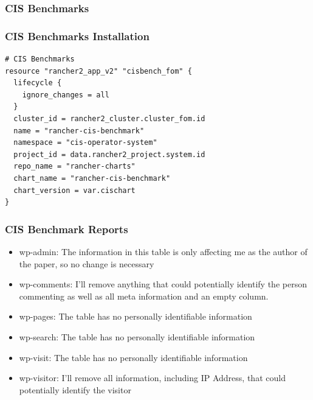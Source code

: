 \subsubsection{CIS Benchmarks}

\subsubsection{CIS Benchmarks Installation}

\begin{lstlisting}[caption=Installing CIS, frame=single, basicstyle=\ttfamily]
# CIS Benchmarks
resource "rancher2_app_v2" "cisbench_fom" {
  lifecycle {
    ignore_changes = all
  }
  cluster_id = rancher2_cluster.cluster_fom.id
  name = "rancher-cis-benchmark"
  namespace = "cis-operator-system"
  project_id = data.rancher2_project.system.id
  repo_name = "rancher-charts"
  chart_name = "rancher-cis-benchmark"
  chart_version = var.cischart
}

\end{lstlisting}

\subsubsection{CIS Benchmark Reports}

\begin{itemize}
 \item wp-admin: The information in this table is only affecting me as the author of the paper, so no change is necessary
 \item wp-comments: I'll remove anything that could potentially identify the person commenting as well as all meta information and an empty column.
 \item wp-pages: The table has no personally identifiable information
 \item wp-search: The table has no personally identifiable information
 \item wp-visit: The table has no personally identifiable information
 \item wp-visitor: I'll remove all information, including IP Address, that could potentially identify the visitor
\end{itemize}
